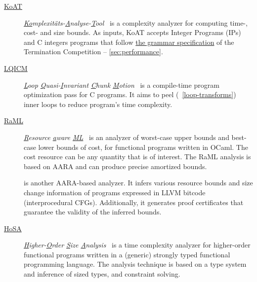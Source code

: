 \begin{description}
\item[\href{https://koat.verify.rwth-aachen.de/cfr_mprf}{KoAT}]
       \emph{\underline{Ko}mplexitäts-\underline{A}nalyse-\underline{T}ool}~\cite{brockschmidt2016}
       is a complexity analyzer for computing time-, cost- and size bounds.
       As inputs, KoAT accepts Integer Programs (IPs) and C integers programs that follow
       \href{https://termination-portal.org/wiki/C_Integer_Programs}{the grammar specification} of the Termination Competition -- \autoref{sec:performance}.

\item[\href{https://github.com/statycc/LQICM_On_C_Toy_Parser}{LQICM}]
      \emph{\underline{L}oop \underline{Q}uasi-\underline{I}nvariant \underline{C}hunk \underline{M}otion}~\cite{moyen20172}
       is a compile-time program optimization pass for C programs.
       It aims to peel (\cf~\autoref{loop-transforms}) inner loops to reduce program's time complexity.

\item[\href{https://www.raml.co/about}{RaML}]
       \emph{\underline{R}esource \underline{a}ware \underline{ML}}~\cite{hoffmann2017}
       is an analyzer of worst-case upper bounds and best-case lower bounds of cost, for functional programs written in OCaml.
       The cost resource can be any quantity that is of interest.
       The RaML analysis is based on AARA and can produce precise amortized bounds.

\item[\href{https://github.com/academic-archive/cav17-pastis}{}]\cite{carbonneaux2017,carbonneaux2018}
      is another AARA-based analyzer. It infers various resource bounds and size
      change information of programs expressed in LLVM bitcode (interprocedural
      CFGs). Additionally, it generates proof certificates that guarantee the
      validity of the inferred bounds.

\item[\href{http://cl-informatik.uibk.ac.at/users/zini/software/hosa/}{HoSA}]
      \emph{\underline{H}igher-\underline{O}rder \underline{S}ize \underline{A}nalysis}~\cite{avanzini2017}
      is a time complexity analyzer for higher-order functional programs written in a (generic) strongly typed functional programming language.
      The analysis technique is based on a type system and inference of sized types, and constraint solving.


\end{description}
